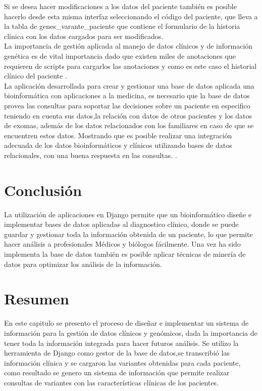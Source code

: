 Si se desea hacer modificaciones a los datos del paciente también es posible hacerlo desde esta misma interfaz seleccionando el código del paciente, que lleva a la tabla de genes\_varante\_paciente que contiene el formulario de la historia clínica con los datos cargados para ser modificados. \\

La importancia de gestión aplicada al manejo de datos clínicos y de información genética es de vital importancia dado que existen miles de anotaciones que requieren de scripts para cargarlos las anotaciones y como es este caso el historial clínico del paciente \cite{Paila2013}. \\

La aplicación desarrollada para crear y gestionar una base de datos aplicada una bioinformática con aplicaciones a la medicina, es necesario que la base de datos provea las consultas para soportar las decisiones sobre un paciente en especifico teniendo en cuenta sus datos,la relación con datos de otros pacientes y los datos de exomas, además de los datos relacionados con los familiares en caso de que se encuentren estos datos. Mostrando que es posible realizar una integración adecuada de los datos bioinformáticos y clínicos utilizando bases de datos relacionales, con una buena respuesta en las consultas. \cite{Sujansky2001}.

\section{Conclusión}

La utilización de aplicaciones en Django permite que un bioinformático diseñe e implementar bases de datos aplicadas al diagnostico clínico, donde se puede guardar y gestionar toda la información obtenida de un paciente, lo que permite hacer análisis a profesionales Médicos y biólogos fácilmente. Una vez ha sido implementa la base de datos también es posible aplicar técnicas de minería de datos para optimizar los análisis de la información. \\

\section*{Resumen}

En este capitulo se presento el proceso de diseñar e implementar un sistema de información para la gestión de datos clínicos y genómicos, dada la importancia de tener toda la información integrada para hacer futuros análisis. Se utilizo la herramienta de Django como gestor de la base de datos,se transcribió las información clínica y se cargaron las variantes obtenidas para cada paciente, como resultado se genero un sistema de información que permite realizar consultas de variantes con las características clínicas de los pacientes.   